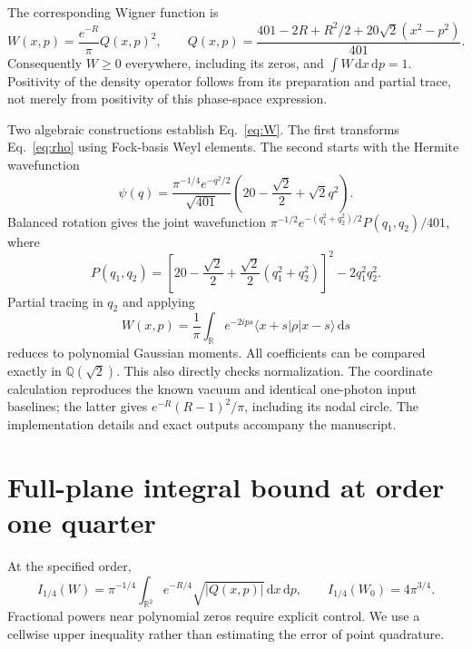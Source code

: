 \documentclass[11pt]{article}
\newcommand{\dd}{\,\mathrm{d}}
\begin{document}
The corresponding Wigner function is
\begin{equation}
 W(x,p)=\frac{e^{-R}}{\pi}Q(x,p)^2,\qquad
 Q(x,p)=\frac{401-2R+R^2/2+20\sqrt{2}(x^2-p^2)}{401}.
 \label{eq:W}
\end{equation}
Consequently $W\geq0$ everywhere, including its zeros, and
$\int W\dd x\dd p=1$. Positivity of the density operator follows from its
preparation and partial trace, not merely from positivity of this
phase-space expression.

Two algebraic constructions establish Eq.~\eqref{eq:W}.
The first transforms Eq.~\eqref{eq:rho} using Fock-basis Weyl elements.
The second starts with the Hermite wavefunction
\begin{equation}
 \psi(q)=\frac{\pi^{-1/4}e^{-q^2/2}}{\sqrt{401}}
 \left(20-\frac{\sqrt{2}}{2}+\sqrt{2}q^2\right).
\end{equation}
Balanced rotation gives the joint wavefunction
$\pi^{-1/2}e^{-(q_1^2+q_2^2)/2}P(q_1,q_2)/401$, where
\begin{equation}
 P(q_1,q_2)=
 \left[20-\frac{\sqrt{2}}2+
       \frac{\sqrt{2}}2(q_1^2+q_2^2)\right]^2
       -2q_1^2q_2^2.
\end{equation}
Partial tracing in $q_2$ and applying
\begin{equation}
 W(x,p)=\frac{1}{\pi}\int_{\mathbb R}
 e^{-2ips}\langle x+s|\rho|x-s\rangle\dd s
\end{equation}
reduces to polynomial Gaussian moments. All coefficients can be compared
exactly in $\mathbb Q(\sqrt{2})$. This also directly checks normalization.
The coordinate calculation reproduces the known vacuum and identical
one-photon input baselines; the latter gives
$e^{-R}(R-1)^2/\pi$, including its nodal circle.
The implementation details and exact outputs accompany the manuscript.

\section{Full-plane integral bound at order one quarter}
At the specified order,
\begin{equation}
 I_{1/4}(W)=\pi^{-1/4}
 \int_{\mathbb R^2}e^{-R/4}\sqrt{|Q(x,p)|}\dd x\dd p,
 \qquad I_{1/4}(W_0)=4\pi^{3/4}.
 \label{eq:quarter}
\end{equation}
Fractional powers near polynomial zeros require explicit control.
We use a cellwise upper inequality rather than estimating the error of
point quadrature.
\end{document}
